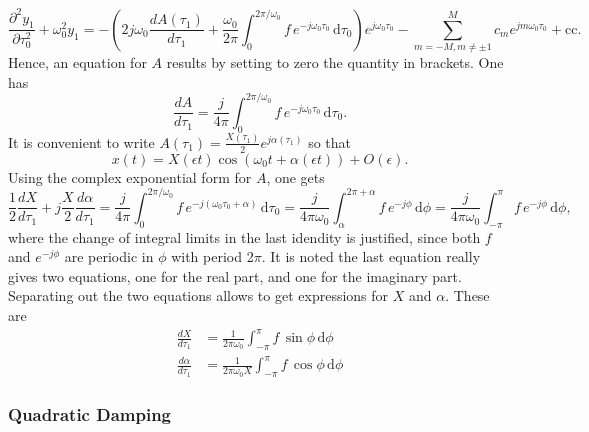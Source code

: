 \documentclass[11pt,twoside,a4paper,english]{book}
\begin{document}
\begin{equation}
\frac{\partial^2 y_1}{\partial\tau_0^2} + \omega_0^2 y_1 = -\left(2j \omega_0\frac{dA(\tau_1)}{d\tau_1} + \frac{\omega_0}{2\pi}\int_0^{2\pi/\omega_0}f \, e^{-j\omega_0 \tau_0} \, \mathrm{d}\tau_0 \right) e^{j\omega_0 \tau_0} - \sum_{m=-M,m\neq \pm 1}^M c_m e^{jm\omega_0 \tau_0} + \text{cc}.
\end{equation}
Hence, an equation for $A$ results by setting to zero the quantity in brackets. One has{}
\begin{equation}\label{eq:LossyTempb}
\frac{dA}{d\tau_1} = \frac{j}{4\pi} \int_0^{2\pi / \omega_0} f\, e^{-j\omega_0 \tau_0}\, \mathrm{d}\tau_0.
\end{equation}
It is convenient to write $A(\tau_1) = \frac{X(\tau_1)}{2}e^{j\alpha(\tau_1)}$
so that
\begin{equation}
x(t) = X(\epsilon t) \cos(\omega_0 t + \alpha(\epsilon t)) + O(\epsilon).
\end{equation}
Using the complex exponential form for $A$, one gets
\begin{equation}
\frac{1}{2}\frac{dX}{d\tau_1} + j\frac{X}{2}\frac{d\alpha}{d\tau_1} = \frac{j}{4\pi} \int_0^{2\pi / \omega_0} f\, e^{-j  \left( \omega_0 \tau_0 + \alpha\right) }  \, \mathrm{d}\tau_0 = \frac{j}{4\pi\omega_0} \int_\alpha^{2\pi+\alpha} f\, e^{-j  \phi  }  \, \mathrm{d}\phi = \frac{j}{4\pi\omega_0} \int_{-\pi}^{\pi} f\, e^{-j  \phi  }  \, \mathrm{d}\phi, 
\end{equation}
where the change of integral limits in the last idendity is justified, since both $f$ and $e^{-j\phi}$ are periodic in $\phi$ with period 2$\pi$. It is noted the last equation really gives two equations, one for the real part, and one for the imaginary part. Separating out the two equations allows to get expressions for $X$ and $\alpha$. These are
\begin{subequations}\label{eq:LossyAmpPhase}
\begin{align}
\frac{dX}{d\tau_1} &= \frac{1}{2\pi\omega_0}\int_{-\pi}^{\pi} f\, \sin\phi \, \mathrm{d}\phi \\
\frac{d\alpha}{d\tau_1} &= \frac{1}{2\pi\omega_0X}\int_{-\pi}^{\pi} f\, \cos\phi \, \mathrm{d}\phi 
\end{align}
\end{subequations}


\subsubsection{Quadratic Damping}
\end{document}

